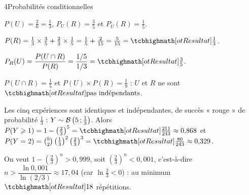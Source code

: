 

\begin{corrigeBac}{4}{Probabilités conditionnelles}
\begin{questions}
  \item $P(U)=\frac26=\frac13$, $P_U(R)=\frac35$ et $P_{\overline U}(R)=\frac15$.
\begin{center}
\end{center}
  \item $P(R)=\frac13\times\frac35+\frac23\times\frac15=\frac15+\frac2{15}=\frac5{15}=\res{\tfrac13}$. 
  \item $P_R(U)=\dfrac{P(U\cap R)}{P(R)}=\dfrac{1/5}{1/3}=\res{\tfrac35}$. 
  \item $P(U\cap R)=\frac15$ et $P(U)\times P(R)=\frac19$ : $U$ et $R$ ne sont $\res{\text{pas indépendants}}$. 
  \item Les cinq expériences sont identiques et indépendantes, de succès « rouge » de probabilité $\frac13$ :
    $Y\sim\mathcal{B}\left(5\,{;}\,\frac13\right)$. Alors $P(Y\geq1)=1-\left(\frac23\right)^{5}=\res{\tfrac{211}{243}}\approx0{,}868$ et
    $P(Y=2)=\binom52\left(\frac13\right)^{2}\left(\frac23\right)^{3}=\res{\tfrac{80}{243}}\approx0{,}329$. \pts{1 pt}
  \item On veut $1-\left(\frac23\right)^{n}>0{,}999$, soit $\left(\frac23\right)^{n}<0{,}001$, c'est-à-dire
    $n>\dfrac{\ln0{,}001}{\ln(2/3)}\approx17{,}04$ (car $\ln\frac23<0$) : au minimum $\res{18}$ répétitions. 
\end{questions}
\end{corrigeBac}

